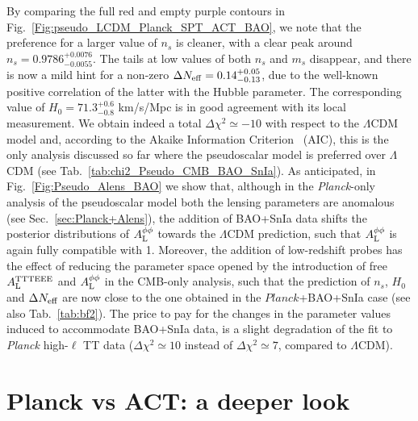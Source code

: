 \documentclass[a4paper,11pt]{article}
\begin{document}
By comparing the full red and empty purple contours in Fig.~\ref{Fig:pseudo_LCDM_Planck_SPT_ACT_BAO}, we note that the preference for a larger value of $n_s$ is cleaner, with a clear peak around $n_s=0.9786_{-0.0055}^{+0.0076}$. The tails at low values of both $n_s$ and $m_s$ disappear, and there is now a mild hint for a non-zero $\Delta N_{\rm eff} = 0.14_{-0.13}^{+0.05} $, due to the well-known positive correlation of the latter with the Hubble parameter.
The corresponding value of $H_0 = 71.3^{+0.6}_{-0.8}$ km/s/Mpc is in good agreement with its local measurement. We obtain indeed a total $\Delta\chi^2\simeq-10$ with respect to the $\Lambda$CDM model and, according to the Akaike Information Criterion~\cite{Akaike1974ANL} (AIC), this is the only analysis discussed so far where the pseudoscalar model is preferred over $\Lambda$CDM (see Tab.~\ref{tab:chi2_Pseudo_CMB_BAO_SnIa}).
As anticipated, in Fig.~\ref{Fig:Pseudo_Alens_BAO} we show that, although in the \textit{Planck}-only analysis of the pseudoscalar model both the lensing parameters are anomalous (see Sec.~\ref{sec:Planck+Alens}), the addition of BAO+SnIa data shifts the posterior distributions of $A^{\phi\phi}_{\rm{L}}$ towards the $\Lambda$CDM prediction, such that $A^{\phi\phi}_{\rm{L}}$ is again fully compatible with 1.
Moreover, the addition of low-redshift probes has the effect of reducing the parameter space opened by the introduction of free $A^{\rm TTTEEE}_{\rm{L}}$ and $A^{\phi\phi}_{{\rm{L}}}$ in the CMB-only analysis, such that the prediction of $n_s$, $H_0$ and $\Delta N_{\rm{eff}}$ are now close to the one obtained in the $Planck$+BAO+SnIa case (see also Tab.~\ref{tab:bf2}).
The price to pay for the changes in the parameter values induced to accommodate BAO+SnIa data, is a slight degradation of the fit to \textit{Planck} high-$\ell$ TT data ($\Delta\chi^2\simeq10$ instead of $\Delta\chi^2\simeq7$, compared to $\Lambda$CDM).
























\section{\label{sec:act2}Planck vs ACT: a deeper look}
\end{document}
